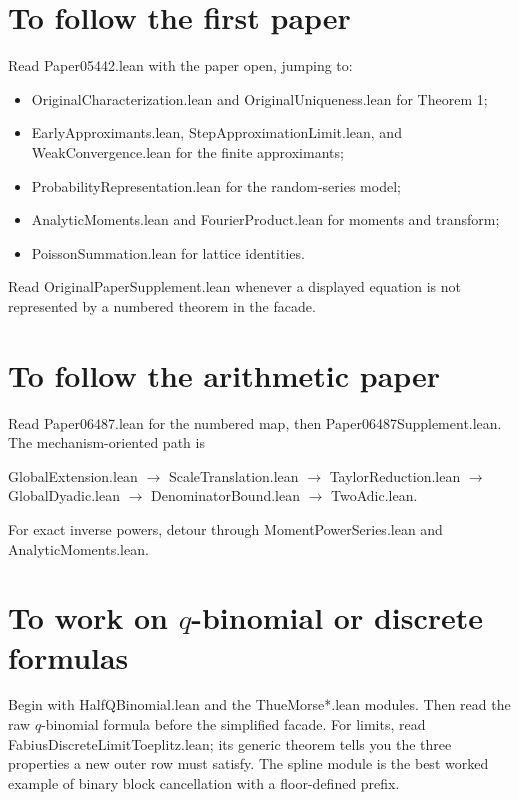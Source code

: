 \documentclass[11pt,a4paper,openany]{book}
\def\module#1{#1.lean}
\newcommand{\module}[1]{\nolinkurl{#1.lean}}
\begin{document}
\section{To follow the first paper}
Read \module{Paper05442} with the paper open, jumping to:
\begin{itemize}
  \item \module{OriginalCharacterization} and \module{OriginalUniqueness} for
        Theorem 1;
  \item \module{EarlyApproximants}, \module{StepApproximationLimit}, and
        \module{WeakConvergence} for the finite approximants;
  \item \module{ProbabilityRepresentation} for the random-series model;
  \item \module{AnalyticMoments} and \module{FourierProduct} for moments and
        transform;
  \item \module{PoissonSummation} for lattice identities.
\end{itemize}
Read \module{OriginalPaperSupplement} whenever a displayed equation is not
represented by a numbered theorem in the facade.

\section{To follow the arithmetic paper}
Read \module{Paper06487} for the numbered map, then
\module{Paper06487Supplement}.  The mechanism-oriented path is
\begin{center}
\module{GlobalExtension} $\longrightarrow$
\module{ScaleTranslation} $\longrightarrow$
\module{TaylorReduction} $\longrightarrow$
\module{GlobalDyadic} $\longrightarrow$
\module{DenominatorBound} $\longrightarrow$
\module{TwoAdic}.
\end{center}
For exact inverse powers, detour through \module{MomentPowerSeries} and
\module{AnalyticMoments}.

\section{To work on \texorpdfstring{$q$-binomial}{q-binomial} or discrete formulas}
Begin with \module{HalfQBinomial} and the \module{ThueMorse*} modules.  Then
read the raw $q$-binomial formula before the simplified facade.  For limits,
read \module{FabiusDiscreteLimitToeplitz}; its generic theorem tells you the
three properties a new outer row must satisfy.  The spline module is the best
worked example of binary block cancellation with a floor-defined prefix.
\end{document}
